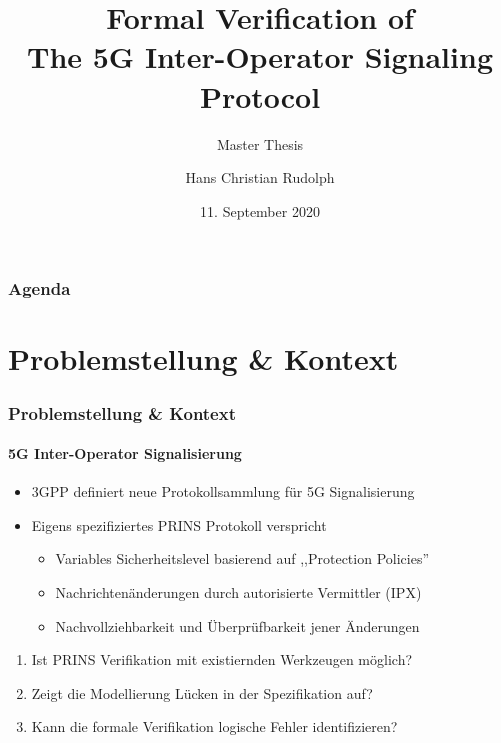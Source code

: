 \documentclass{beamer}
\title{Formal Verification of\\ The 5G Inter-Operator Signaling Protocol}
\subtitle{Master Thesis}
\author{Hans Christian Rudolph}
\institute{Hochschule Wismar}
\date{11. September 2020}
\begin{document}
\frame{\titlepage}

\begin{frame}
    \frametitle{Agenda}
    \tableofcontents
\end{frame}

\section{Problemstellung \& Kontext}

\begin{frame}
    \frametitle{Problemstellung \& Kontext}
    \framesubtitle{5G Inter-Operator Signalisierung}

    \begin{itemize}
        \item<1-> 3GPP definiert neue Protokollsammlung für 5G Signalisierung
        \vspace*{2mm}
        \item<1-> Eigens spezifiziertes PRINS Protokoll verspricht
        \begin{itemize}
            \item<1-> Variables Sicherheitslevel basierend auf ,,Protection Policies''
            \item<1-> Nachrichtenänderungen durch autorisierte Vermittler (IPX)
            \item<1-> Nachvollziehbarkeit und Überprüfbarkeit jener Änderungen
        \end{itemize}
    \end{itemize}
    \vspace*{3mm}
    \begin{enumerate}
        \item<2-> Ist PRINS Verifikation mit existiernden Werkzeugen möglich?
        \item<3-> Zeigt die Modellierung Lücken in der Spezifikation auf?
        \item<4-> Kann die formale Verifikation logische Fehler identifizieren?
    \end{enumerate}
\end{frame}
\end{document}
